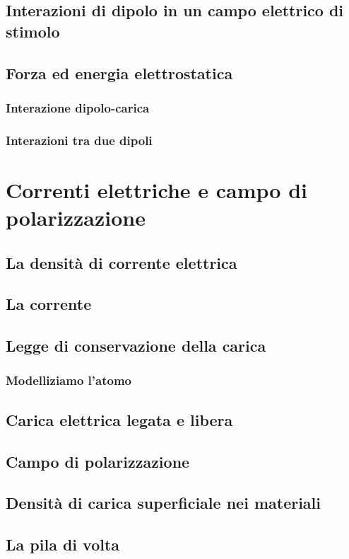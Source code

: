 \documentclass{book}
\begin{document}
\section{Interazioni di dipolo in un campo elettrico di stimolo}
\section{Forza ed energia elettrostatica}
\subsection{Interazione dipolo-carica}
\subsection{Interazioni tra due dipoli}

\chapter{Correnti elettriche e campo di polarizzazione}
\section{La densit\`a di corrente elettrica}
\section{La corrente}
\section{Legge di conservazione della carica}
\subsection{Modelliziamo l'atomo}
\section{Carica elettrica legata e libera}
\section{Campo di polarizzazione}
\section{Densit\`a di carica superficiale nei materiali}
\section{La pila di volta}
\end{document}
